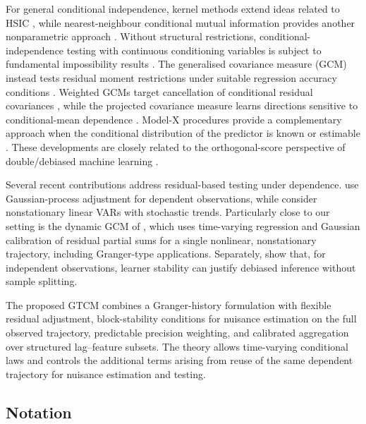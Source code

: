 \documentclass[12pt]{article}
\numberwithin{equation}{section}
\begin{document}
For general conditional independence, kernel methods extend ideas related to
HSIC \citep{gretton2005measuring,gretton2007kernel,zhang2012kernel}, while nearest-neighbour conditional mutual information provides another nonparametric approach \citep{runge2018conditional}. Without structural restrictions, conditional-independence testing with continuous conditioning variables is subject to fundamental impossibility results \citep{shah2020hardness}. The generalised covariance measure (GCM) instead tests residual moment restrictions under suitable regression accuracy conditions \citep{shah2020hardness}. Weighted GCMs target cancellation of conditional residual covariances \citep{scheidegger2022weighted}, while the projected covariance measure learns directions sensitive to conditional-mean dependence \citep{lundborg2022projected}. Model-X procedures provide a complementary approach when the conditional distribution of the predictor is known or estimable \citep{candes2018panning,niu2024reconciling,shaer2023model}. These developments are closely related to the orthogonal-score perspective of double/debiased machine learning \citep{chernozhukov2018double}.

Several recent contributions address residual-based testing under dependence. \citet{flaxman2015gaussian} use Gaussian-process adjustment for dependent observations, while \citet{malinsky2019learning} consider nonstationary linear VARs with stochastic trends. Particularly close to our setting is the dynamic GCM of \citet{wieck2025conditional}, which uses time-varying regression and Gaussian calibration of residual partial sums for a single nonlinear, nonstationary trajectory, including Granger-type applications. Separately, \citet{chen2022debiased} show that, for independent observations, learner stability can justify debiased inference without sample splitting.

The proposed GTCM combines a Granger-history formulation with flexible residual adjustment, block-stability conditions for nuisance estimation on the full observed trajectory, predictable precision weighting, and calibrated aggregation over structured lag--feature subsets. The theory allows time-varying conditional laws and controls the additional terms arising from reuse of the same dependent trajectory for nuisance estimation and testing.


\subsection{Notation}
\label{sec:notation}
\end{document}
